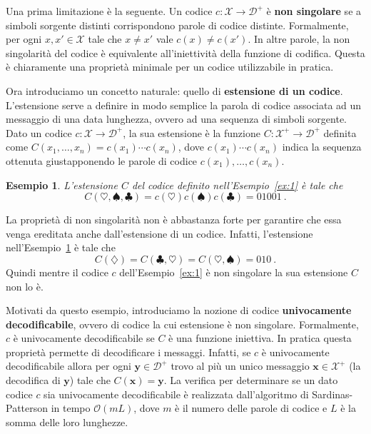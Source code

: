 \documentclass[11pt]{article}
\newtheorem{example}[theorem]{Esempio}
\newcommand{\bx}{ \boldsymbol{x} }
\newcommand{\by}{ \boldsymbol{y} }
\newcommand{\scD}{\mathcal{D}}
\newcommand{\scX}{\mathcal{X}}
\begin{document}
Una prima limitazione è la seguente. Un codice $c : \scX\to\scD^+$ è \textbf{non singolare} se a simboli sorgente distinti corrispondono parole di codice distinte. Formalmente, per ogni $x,x'\in\scX$ tale che $x \neq x'$ vale $c(x) \neq c(x')$. In altre parole, la non singolarità del codice è equivalente all'iniettività della funzione di codifica. Questa è chiaramente una proprietà minimale per un codice utilizzabile in pratica.

Ora introduciamo un concetto naturale: quello di \textbf{estensione di un codice}. L'estensione serve a definire in modo semplice la parola di codice associata ad un messaggio di una data lunghezza, ovvero ad una sequenza di simboli sorgente. Dato un codice $c : \scX\to\scD^+$, la sua estensione è la funzione $C : \scX^+\to\scD^+$ definita come
$
    C(x_1,\dots,x_n) = c(x_1) \cdots c(x_n)
$, dove $c(x_1) \cdots c(x_n)$ indica la sequenza ottenuta giustapponendo le parole di codice $c(x_1),\dots,c(x_n)$.
%
\begin{example}
\label{ex:2}
L'estensione $C$ del codice definito nell'Esempio~\ref{ex:1} è tale che
\[
    C(\heartsuit,\spadesuit,\clubsuit) = c(\heartsuit)c(\spadesuit)c(\clubsuit) = 01001~.
\]
\end{example}
%
La proprietà di non singolarità non è abbastanza forte per garantire che essa venga ereditata anche dall'estensione di un codice. Infatti, l'estensione nell'Esempio~\ref{ex:2} è tale che
\[
    C(\diamondsuit) = C(\clubsuit,\heartsuit) = C(\heartsuit,\spadesuit) = 010~.
\]
Quindi mentre il codice $c$ dell'Esempio~\ref{ex:1} è non singolare la sua estensione $C$ non lo è.

Motivati da questo esempio, introduciamo la nozione di codice \textbf{univocamente decodificabile}, ovvero di codice la cui estensione è non singolare. Formalmente, $c$ è univocamente decodificabile se $C$ è una funzione iniettiva. In pratica questa proprietà permette di decodificare i messaggi. Infatti, se $c$ è univocamente decodificabile allora per ogni $\by\in\scD^+$ trovo al più un unico messaggio $\bx\in\scX^+$ (la decodifica di $\by$) tale che $C(\bx) = \by$. La verifica per determinare se un dato codice $c$ sia univocamente decodificabile è realizzata dall'algoritmo di Sardinas-Patterson in tempo $\mathcal{O}(mL)$, dove $m$ è il numero delle parole di codice e $L$ è la somma delle loro lunghezze.
\end{document}
